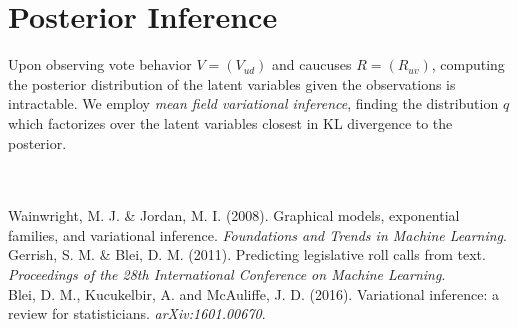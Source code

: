 \documentclass{article}
\begin{document}
\section{Posterior Inference}

Upon observing vote behavior $V = (V_{ud})$ and caucuses $R = (R_{uv})$, computing the posterior distribution of the latent variables given the observations is intractable. We employ {\sl mean field variational inference}, finding the distribution $q$ which factorizes over the latent variables closest in KL divergence to the posterior. 


~\\~\\
\noindent[1] Wainwright, M. J. \& Jordan, M. I. (2008). Graphical models, exponential families, and variational inference. {\sl Foundations and Trends in Machine Learning}. \\

\noindent[2] Gerrish, S. M. \& Blei, D. M. (2011). Predicting legislative roll calls from text. {\it Proceedings of the 28th International Conference on Machine Learning}. \\

\noindent[3] Blei, D. M., Kucukelbir, A. and McAuliffe, J. D. (2016). Variational inference: a review for statisticians. {\sl arXiv:1601.00670}.
\end{document}
